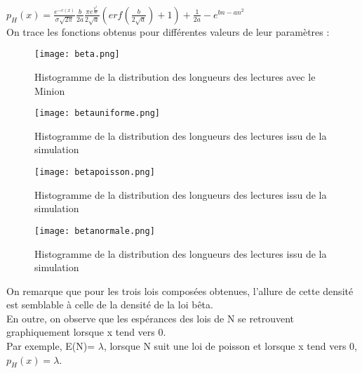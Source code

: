 \documentclass[11pt,a4paper]{article} %
\begin{document}
$p_{H}(x)=\frac{e^{-c(x)}}{\sigma \sqrt{2\pi}} \frac{b}{2a} \frac{\pi e^{\frac{b^2}{4a}}}{2\sqrt{a}} (erf(\frac{b}{2\sqrt{a}})+1)+ \frac{1}{2a}-e^{bn-an^2}$ \\

On trace les fonctions obtenus pour différentes valeurs de leur paramètres : \\

\begin{figure}[h]
    \begin{minipage}[c]{.46\linewidth}
        \centering
        \texttt{[image: beta.png]}
        \caption{\small Histogramme de la distribution des longueurs des lectures avec le Minion}
    \end{minipage}
    \hfill%
    \begin{minipage}[c]{.46\linewidth}
        \centering
        \texttt{[image: betauniforme.png]}
        \caption{\small Histogramme de la distribution des longueurs des lectures issu de la simulation}
    \end{minipage}
\end{figure} 
\begin{figure}[h]
    \begin{minipage}[c]{.46\linewidth}
        \centering
        \texttt{[image: betapoisson.png]}
        \caption{\small Histogramme de la distribution des longueurs des lectures issu de la simulation}
    \end{minipage}
    \hfill%
    \begin{minipage}[c]{.46\linewidth}
        \centering
        \texttt{[image: betanormale.png]}
        \caption{\small Histogramme de la distribution des longueurs des lectures issu de la simulation}
    \end{minipage}
\end{figure}

On remarque que pour les trois lois composées obtenues, l'allure de cette densité est semblable à celle de la densité de la loi bêta. \\
En outre, on observe que les espérances des lois de N se retrouvent graphiquement lorsque x tend vers 0.\\
Par exemple, E(N)= $\lambda$, lorsque N suit une loi de poisson et lorsque x tend vers 0, $p_{H}(x)= \lambda$. \\
\end{document}
